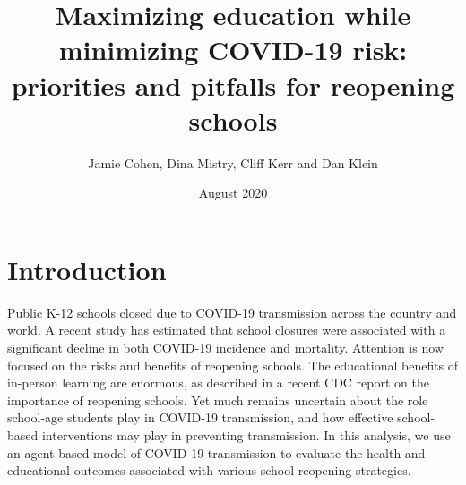 \documentclass{article}
\title{Maximizing education while minimizing COVID-19 risk: priorities and pitfalls for reopening schools}
\author{Jamie Cohen, Dina Mistry, Cliff Kerr and Dan Klein }
\date{August 2020}
\begin{document}
\maketitle

\section{Introduction}

Public K-12 schools closed due to COVID-19 transmission across the country and world. A recent study has estimated that school closures were associated with a significant decline in both COVID-19 incidence and mortality. Attention is now focused on the risks and benefits of reopening schools. The educational benefits of in-person learning are enormous, as described in a recent CDC report on the importance of reopening schools. Yet much remains uncertain about the role school-age students play in COVID-19 transmission, and how effective school-based interventions may play in preventing transmission. In this analysis, we use an agent-based model of COVID-19 transmission to evaluate the health and educational outcomes associated with various school reopening strategies. 
\end{document}
